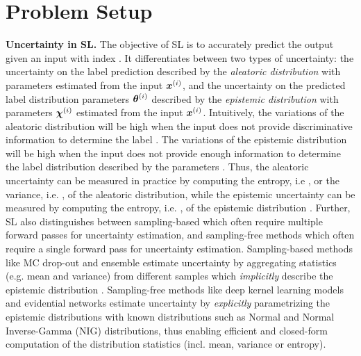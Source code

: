 \vspace{-3mm}
\section{Problem Setup}
\label{sec:setup_011}

\textbf{Uncertainty in SL.} The objective of SL is to accurately predict the output \smash{$\y\dataix$} given an input \smash{$\x\dataix$} with index \smash{$\idata$}. It differentiates between two types of uncertainty: the uncertainty on the label prediction \smash{$\y\dataix$} described by the \emph{aleatoric distribution} \smash{$\prob(\y\dataix \mid \expparam\dataix)$} with parameters \smash{$\expparam\dataix$} estimated from the input $\x\dataix$, and the uncertainty on the predicted label distribution parameters $\expparam\dataix$ described by the \emph{epistemic distribution} \smash{$\prior(\expparam\dataix \mid \priorparam\dataix)$} with parameters $\priorparam\dataix$ estimated from the input $\x\dataix$. Intuitively, the variations of the aleatoric distribution will be high when the input \smash{$\x\dataix$} does not provide discriminative information to determine the label \smash{$\y\dataix$}. The variations of the epistemic distribution will be high when the input \smash{$\x\dataix$} does not provide enough information to determine the label distribution \smash{$\prior(\expparam\dataix \mid \priorparam\dataix)$} described by the parameters \smash{$\priorparam\dataix$}. Thus, the aleatoric uncertainty can be measured in practice by computing the entropy, i.e , or the variance, i.e. , of the aleatoric distribution, while the epistemic uncertainty can be measured by computing the entropy, i.e. , of the epistemic distribution \cite{priornet, postnet, natpn}. Further, SL also distinguishes between sampling-based which often require multiple forward passes for uncertainty estimation, and sampling-free methods which often require a single forward pass for uncertainty estimation. Sampling-based methods like MC drop-out \cite{dropout} and ensemble \cite{ensembles, hyper-ensembles, batch-ensembles} estimate uncertainty by aggregating statistics (e.g. mean and variance) from different samples which \emph{implicitly} describe the epistemic distribution \smash{$\prior(\expparam\dataix \mid \priorparam\dataix)$}. Sampling-free methods like deep kernel learning models \cite{simple-baseline-uncertainty, due, duq, uceloss} and evidential networks \cite{postnet, priornet, natpn, evidential-regression} estimate uncertainty by \emph{explicitly} parametrizing the epistemic distributions \smash{$\prior(\expparam\dataix) \mid \priorparam\dataix)$} with known distributions such as Normal and Normal Inverse-Gamma (NIG) distributions, thus enabling efficient and closed-form computation of the distribution statistics (incl. mean, variance or entropy).

